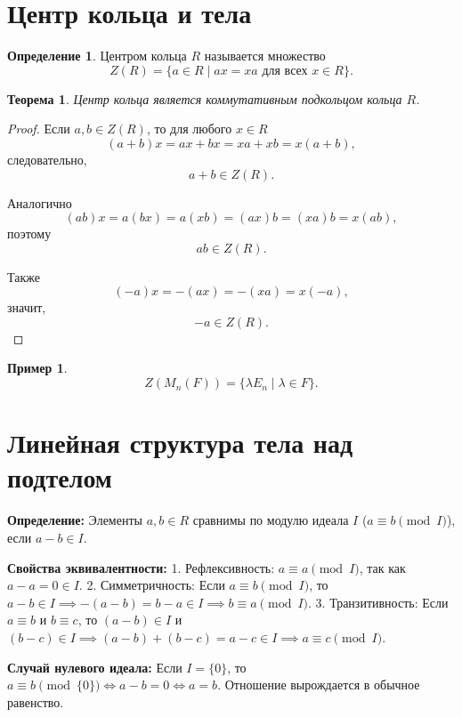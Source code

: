 \documentclass[12pt, a4paper]{article}
\newtheorem{theorem}{Теорема}
\theoremstyle{definition}
\newtheorem{definition}{Определение}
\newtheorem{example}{Пример}
\theoremstyle{remark}
\begin{document}
\section{Центр кольца и тела}

\begin{definition}
	Центром кольца $R$ называется множество
	\[
	Z(R)=\{a\in R\mid ax=xa \text{ для всех } x\in R\}.
	\]
\end{definition}

\begin{theorem}
	Центр кольца является коммутативным подкольцом кольца $R$.
\end{theorem}

\begin{proof}
	Если $a,b\in Z(R)$, то для любого $x\in R$
	\[
	(a+b)x=ax+bx=xa+xb=x(a+b),
	\]
	следовательно,
	\[
	a+b\in Z(R).
	\]
	
	Аналогично
	\[
	(ab)x=a(bx)=a(xb)=(ax)b=(xa)b=x(ab),
	\]
	поэтому
	\[
	ab\in Z(R).
	\]
	
	Также
	\[
	(-a)x=-(ax)=-(xa)=x(-a),
	\]
	значит,
	\[
	-a\in Z(R).
	\]
\end{proof}

\begin{example}
	\[
	Z(M_n(F))=\{\lambda E_n\mid \lambda\in F\}.
	\]
\end{example}

\section{Линейная структура тела над подтелом}


\textbf{Определение:} Элементы $a, b \in R$ сравнимы по модулю идеала $I$ ($a \equiv b \pmod I$), если $a - b \in I$.

\textbf{Свойства эквивалентности:}
1. Рефлексивность: $a \equiv a \pmod I$, так как $a - a = 0 \in I$.
2. Симметричность: Если $a \equiv b \pmod I$, то $a - b \in I \implies -(a - b) = b - a \in I \implies b \equiv a \pmod I$.
3. Транзитивность: Если $a \equiv b$ и $b \equiv c$, то $(a - b) \in I$ и $(b - c) \in I \implies (a - b) + (b - c) = a - c \in I \implies a \equiv c \pmod I$.

\textbf{Случай нулевого идеала:} Если $I = \{0\}$, то $a \equiv b \pmod{\{0\}} \iff a - b = 0 \iff a = b$. Отношение вырождается в обычное равенство.
\end{document}
